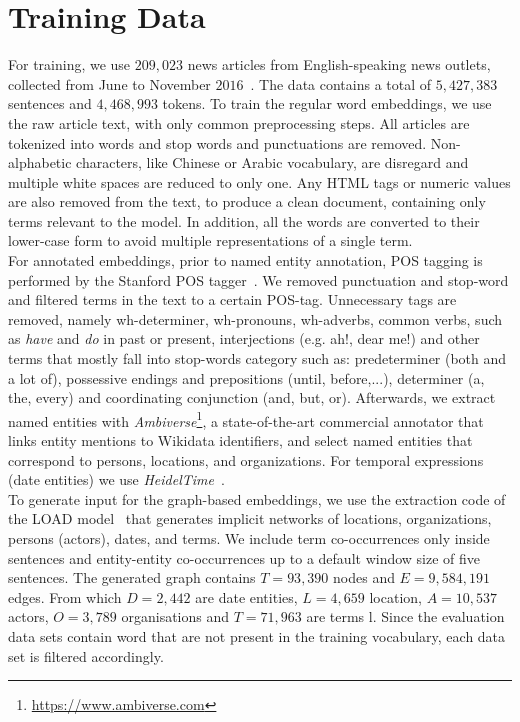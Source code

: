 \section{Training Data}\label{sec:data}
For training, we use $209,023$ news articles from English-speaking news outlets, collected from June to November $2016$~. The data contains a total of $5,427,383$ sentences and $4,468,993$ tokens. To train the regular word embeddings, we use the raw article text, with only common preprocessing steps. All articles are tokenized into words and stop words and punctuations are removed. Non-alphabetic characters, like Chinese or Arabic vocabulary, are disregard and multiple white spaces are reduced to only one.  Any HTML tags or numeric values are also removed from the text, to produce a clean document, containing only terms relevant to the model. In addition, all the words are converted to their lower-case form to avoid multiple representations of a single term.\\
For annotated embeddings, prior to named entity annotation, POS tagging is performed by   the Stanford POS tagger~. 
We removed punctuation and stop-word and filtered terms in the text to a certain POS-tag. Unnecessary tags are removed, namely  wh-determiner, wh-pronouns, wh-adverbs, common verbs, such as  \emph{have} and  \emph{do} in past or present, interjections (e.g. ah!, dear me!) and other terms that mostly fall into stop-words category such as: predeterminer (both and a lot of), possessive endings and prepositions (until, before,...), determiner (a, the, every) and coordinating conjunction (and, but, or). Afterwards, we extract named entities with \emph{Ambiverse}\footnote{\url{https://www.ambiverse.com}}, a state-of-the-art commercial annotator that links entity mentions to Wikidata identifiers, and select named entities that correspond to persons, locations, and organizations. For temporal expressions (date entities) we use \emph{HeidelTime}~.\\
To generate input for the graph-based embeddings, we use the extraction code of the LOAD model~ that generates implicit networks of locations, organizations, persons (actors), dates, and terms. 
We include term co-occurrences only inside sentences and entity-entity co-occurrences up to a default window size of five sentences. The generated graph contains $T=93,390$ nodes and $E=9,584,191$ edges. From which $D=2,442$  are date entities, $L=4,659$ location, $A=10,537$ actors, $O=3,789$ organisations and $T=71,963$ are terms l.
Since the evaluation data sets contain word that are not present in the training vocabulary, each data set is filtered accordingly.


